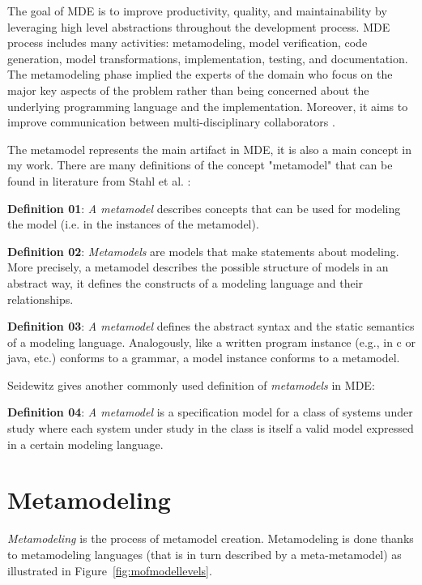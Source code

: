 
The goal of MDE is to improve productivity, quality, and maintainability by leveraging high level abstractions throughout the development process. MDE process includes many activities: metamodeling, model verification, code generation, model transformations, implementation, testing, and documentation. The metamodeling phase implied the experts of the domain who focus on the major key aspects of the problem rather than being concerned about the underlying programming language and the implementation. Moreover, it aims to improve communication between multi-disciplinary collaborators \cite{wortmann2020modeling}.

The metamodel represents the main artifact in MDE, it is also a main concept in my work. There are many definitions of the concept "metamodel" that can be found in literature from Stahl et al. \cite{stahl2006model}:

\textbf{Definition 01}: \textit{A metamodel} describes concepts that can be used for modeling the model (i.e. in the instances of the metamodel).

\textbf{Definition 02}: \textit {Metamodels} are models that make statements about modeling. More precisely, a metamodel describes the possible structure of models in an abstract way, it defines the constructs of a modeling language and their relationships.

\textbf{Definition 03}: \textit{A metamodel} defines the abstract syntax and the static semantics of a modeling language. Analogously, like a written program instance (e.g., in c or java, etc.) conforms to a grammar, a model instance conforms to a metamodel.

Seidewitz \cite{seidewitz2003models} gives another commonly used definition of \textit{metamodels} in MDE:

\textbf{Definition 04}: \textit{A metamodel} is a specification model for a class of systems under study where each system under study in the class is itself a valid model expressed in a certain modeling language.

\section{Metamodeling}
\label{Metamodeling}
\textit{Metamodeling} is the process of metamodel creation. Metamodeling is done thanks to metamodeling languages (that is in turn described by a meta-metamodel) as illustrated in Figure~\ref{fig:mofmodellevels}.

